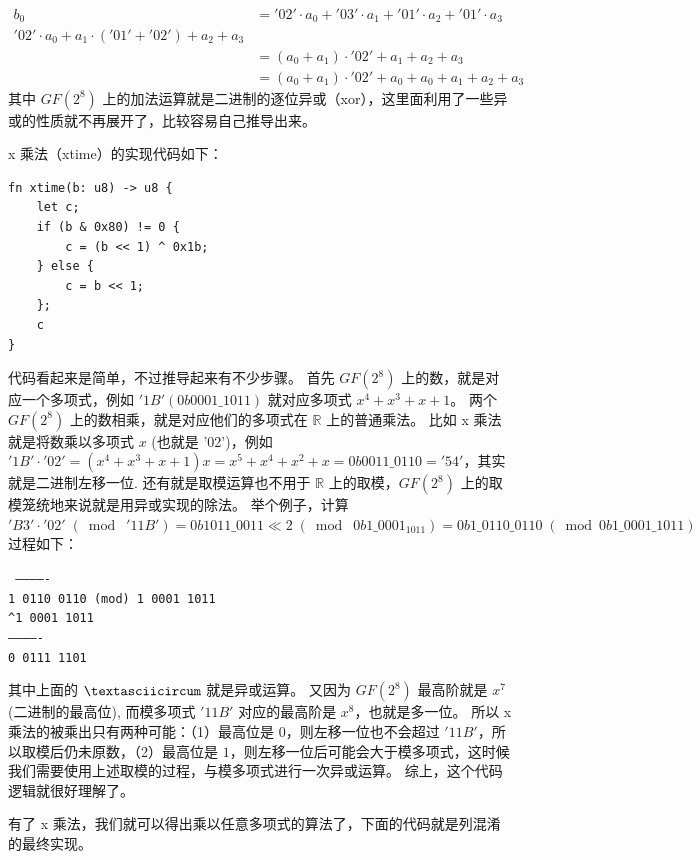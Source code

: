 \documentclass[degree=project,degree-type=project,cjk-font=noto]{thuthesis}
\begin{document}
\begin{align*}
    b_0 &= '02' \cdot a_0 + '03' \cdot a_1 + '01' \cdot a_2 + '01' \cdot a_3 \\
    '02' \cdot a_0 + a_1 \cdot ('01' + '02') + a_2 + a_3 \\
    &= (a_0 + a_1) \cdot '02' + a_1 + a_2 + a_3 \\
    &= (a_0 + a_1) \cdot '02' + a_0 + a_0 + a_1 + a_2 + a_3
\end{align*}
其中 $GF(2^8)$ 上的加法运算就是二进制的逐位异或（xor），这里面利用了一些异或的性质就不再展开了，比较容易自己推导出来。

x 乘法（xtime）的实现代码如下：

  \begin{verbatim}
fn xtime(b: u8) -> u8 {
    let c;
    if (b & 0x80) != 0 {
        c = (b << 1) ^ 0x1b;
    } else {
        c = b << 1;
    };
    c
}
  \end{verbatim}

代码看起来是简单，不过推导起来有不少步骤。
首先 $GF(2^8)$ 上的数，就是对应一个多项式，例如 $'1B' (0b0001\_1011)$ 就对应多项式 $x^4 + x^3 + x + 1$。
两个 $GF(2^8)$ 上的数相乘，就是对应他们的多项式在 $\mathbb{R}$ 上的普通乘法。
比如 x 乘法就是将数乘以多项式 $x$ (也就是 '02')，例如 $'1B' \cdot '02' = (x^4 + x^3 + x + 1) x = x^5 + x^4 + x^2 + x = 0b0011\_0110 = '54'$，其实就是二进制左移一位.
还有就是取模运算也不用于 $\mathbb{R}$ 上的取模，$GF(2^8)$ 上的取模笼统地来说就是用异或实现的除法。
举个例子，计算 $'B3' \cdot '02' \;(\bmod\; '11B') = 0b1011\_0011 \ll 2 \;(\bmod\; 0b1\_0001_1011) = 0b1\_0110\_0110 \;(\bmod 0b1\_0001\_1011)$ 过程如下：

{\tt
{\noindent-------------}\\
\phantom{0 }1 0110 0110 (mod) 1 0001 1011 \\
\textasciicircum\phantom{ }1 0001 1011 \\
------------- \\
\phantom{0 }0 0111 1101
}

其中上面的 $\textasciicircum$ 就是异或运算。
又因为 $GF(2^8)$ 最高阶就是 $x^7$ (二进制的最高位), 而模多项式 $'11B'$ 对应的最高阶是 $x^8$，也就是多一位。
所以 x 乘法的被乘出只有两种可能：（1）最高位是 $0$，则左移一位也不会超过 $'11B'$，所以取模后仍未原数，（2）最高位是 $1$，则左移一位后可能会大于模多项式，这时候我们需要使用上述取模的过程，与模多项式进行一次异或运算。
综上，这个代码逻辑就很好理解了。

有了 x 乘法，我们就可以得出乘以任意多项式的算法了，下面的代码就是列混淆的最终实现。
\end{document}

